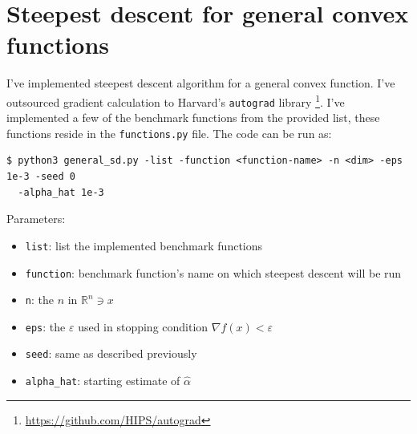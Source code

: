 \documentclass[11pt]{article}
\begin{document}
\section{Steepest descent for general convex functions}
I've implemented steepest descent algorithm for a general convex function. I've
outsourced gradient calculation to Harvard's \verb|autograd| library%
\footnote[1]{\url{https://github.com/HIPS/autograd}}. I've implemented
a few of the benchmark functions from the provided list, these functions reside
in the \verb|functions.py| file. The code can be run as:
\begin{verbatim}
$ python3 general_sd.py -list -function <function-name> -n <dim> -eps 1e-3 -seed 0
  -alpha_hat 1e-3
\end{verbatim}
Parameters:
\begin{itemize}
    \item \verb|list|: list the implemented benchmark functions
    \item \verb|function|: benchmark function's name on which steepest descent will be run
    \item \verb|n|: the $n$ in $\mathbb{R}^n\ni x$
    \item \verb|eps|: the $\varepsilon$ used in stopping condition $\nabla f(x)<\varepsilon$
    \item \verb|seed|: same as described previously
    \item \verb|alpha_hat|: starting estimate of $\hat{\alpha}$
\end{itemize}
%
%
\end{document}
